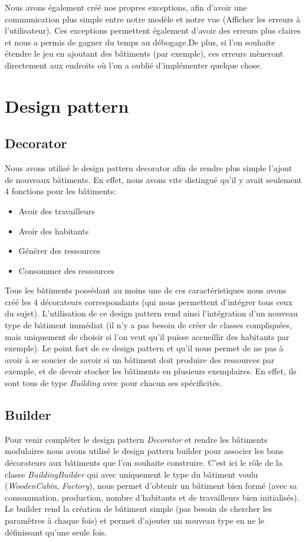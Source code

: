 \documentclass{article}
\begin{document}
Nous avons également créé nos propres exceptions, afin d'avoir une communication plus simple entre notre modèle et notre vue
(Afficher les erreurs à l'utilisateur). Ces exceptions permettent également d'avoir des erreurs plus claires et nous a permis
de gagner du temps au débogage.De plus, si l'on souhaite étendre le jeu en ajoutant des bâtiments (par exemple), ces erreurs mèneront
directement aux endroits où  l'on a oublié d'implémenter quelque chose.
\section{Design pattern}
\subsection{Decorator}
Nous avons utilisé le design pattern decorator afin de rendre plus simple l'ajout de nouveaux bâtiments.
En effet, nous avons vite distingué qu'il y avait seulement 4 fonctions pour les bâtiments:
\begin{itemize}
    \item Avoir des travailleurs
    \item Avoir des habitants
    \item Générer des ressources
    \item Consommer des ressources
\end{itemize}
Tous les bâtiments possédant au moins une de ces caractéristiques nous avons créé les 4 décorateurs correspondants
(qui nous permettent d'intégrer tous ceux du sujet). L'utilisation de ce design pattern rend ainsi l'intégration
d'un nouveau type de bâtiment immédiat (il n'y a pas besoin de créer de classes compliquées, mais uniquement de choisir
si l'on veut qu'il puisse accueillir des habitants par exemple). Le point fort de ce design pattern et qu'il nous permet
de ne pas à avoir à se soucier de savoir si un bâtiment doit produire des ressources par exemple, et de devoir stocker les
bâtiments en plusieurs exemplaires. En effet, ils sont tous de type \textit{Building} avec pour chacun ses spécificités.

\subsection{Builder}
Pour venir compléter le design pattern \textit{Decorator} et rendre les bâtiments modulaires nous avons utilisé le design
pattern builder pour associer les bons décorateurs aux bâtiments que l'on souhaite construire. C'est ici le rôle de la
classe \textit{BuildingBuilder} qui avec uniquement le type du bâtiment voulu (\textit{WoodenCabin}, \textit{Factory}), 
nous permet d'obtenir un bâtiment bien formé (avec sa consommation, production, nombre d'habitants et de travailleurs bien 
initialisés). Le builder rend la création de bâtiment simple (pas besoin de chercher les paramètres à chaque fois) et permet 
d'ajouter un nouveau type en ne le définissant qu'une seule fois.
\end{document}
